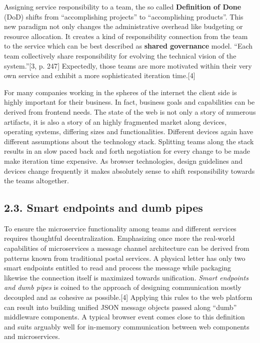 \documentclass[]{article}
\begin{document}
Assigning service responsibility to a team, the so called
\textbf{Definition of Done} (DoD) shifts from ``accomplishing projects''
to ``accomplishing products''. This new paradigm not only changes the
administrative overhead like budgeting or resource allocation. It
creates a kind of responsibility connection from the team to the service
which can be best described as \textbf{shared governance} model. ``Each
team collectively share responsibility for evolving the technical vision
of the system.''{[}3, p. 247{]} Expectedly, those teams are more
motivated within their very own service and exhibit a more sophisticated
iteration time.{[}4{]}

For many companies working in the spheres of the internet the client
side is highly important for their business. In fact, business goals and
capabilities can be derived from frontend needs. The state of the web is
not only a story of numerous artifacts, it is also a story of an highly
fragmented market along devices, operating systems, differing sizes and
functionalities. Different devices again have different assumptions
about the technology stack. Splitting teams along the stack results in
an slow paced back and forth negotiation for every change to be made
make iteration time expensive. As browser technologies, design
guidelines and devices change frequently it makes absolutely sense to
shift responsibility towards the teams altogether.

\subsection{2.3. Smart endpoints and dumb
pipes}\label{smart-endpoints-and-dumb-pipes}

To ensure the microservice functionality among teams and different
services requires thoughtful decentralization. Emphasizing once more the
real-world capabilities of microservices a message channel architecture
can be derived from patterns known from traditional postal services. A
physical letter has only two smart endpoints entitled to read and
process the message while packaging likewise the connection itself is
maximized towards unification. \emph{Smart endpoints and dumb pipes} is
coined to the approach of designing communication mostly decoupled and
as cohesive as possible.{[}4{]} Applying this rules to the web platform
can result into building unified JSON message objects passed along
``dumb'' middleware components. A typical browser event comes close to
this definition and suits arguably well for in-memory communication
between web components and microservices.
\end{document}
